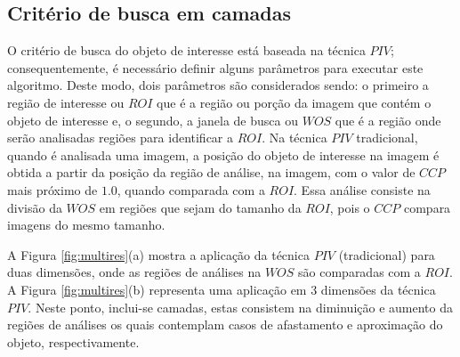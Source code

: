 \subsection{Critério de busca em camadas}

O critério de busca do objeto de interesse está baseada na técnica $PIV$; 
consequentemente, é necessário definir alguns parâmetros para executar  
este algoritmo. Deste modo, dois parâmetros são considerados sendo: 
o primeiro a região de interesse ou $ROI$ 
 que é a região ou porção da imagem que contém
o objeto de interesse e, o segundo, a janela de busca ou $WOS$
que é a região onde serão analisadas regiões para identificar a $ROI$. 
Na técnica $PIV$ tradicional, quando é analisada uma imagem, 
a posição do objeto de interesse na imagem é obtida a partir 
da posição da região de análise, na imagem, com o valor de $CCP$ mais próximo de $1.0$,
quando comparada com a $ROI$. 
Essa análise consiste na divisão da $WOS$ em regiões que sejam do tamanho da $ROI$, pois o $CCP$
compara imagens do mesmo tamanho.

A Figura \ref{fig:multires}(a) mostra a aplicação da técnica $PIV$ (tradicional)
para duas dimensões, onde as regiões de análises na $WOS$
são comparadas com a $ROI$. 
A Figura \ref{fig:multires}(b) representa uma aplicação em 3 dimensões da técnica $PIV$. 
Neste ponto, inclui-se camadas, estas consistem na diminuição e aumento da regiões de análises os quais 
contemplam casos de afastamento e aproximação do objeto, respectivamente.


